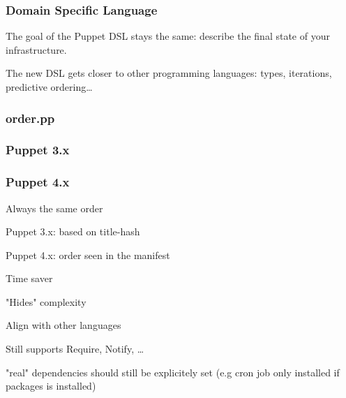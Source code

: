 \begin{frame}\frametitle{Domain Specific Language}
    \begin{center}
        \huge{The goal of the Puppet DSL stays the same: describe the final state of your infrastructure.}
    \end{center}
\end{frame}

\begin{frame}
    \begin{center}
        \huge{The new DSL gets closer to other programming languages: types, iterations, predictive ordering\dots}
    \end{center}
\end{frame}

\begin{frame}
    \frametitle{order.pp}
    \lstset{language=Puppet}
    \lstset{%
         basicstyle=\LARGE,
     }
 
 \end{frame}
\begin{frame}
    \frametitle{Puppet 3.x}
 
 \end{frame}
\begin{frame}
    \frametitle{Puppet 4.x}
 
 \end{frame}
 \begin{iframe}[Ordering]
\item Always the same order
\item Puppet 3.x: based on title-hash
\item Puppet 4.x: order seen in the manifest
\end{iframe}
 \begin{iframe}
 \item Time saver
\item "Hides" complexity
\item Align with other languages
\item Still supports Require, Notify, \dots
\item "real" dependencies should still be explicitely set (e.g cron job only installed if packages is installed)
\end{iframe}

